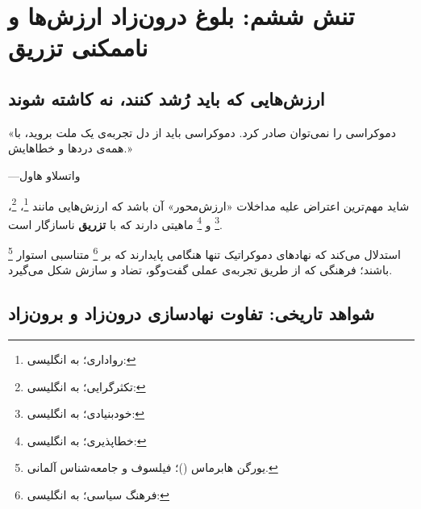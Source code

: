 \section{تنش ششم: بلوغ درون‌زاد ارزش‌ها و ناممکنی تزریق}
\label{sec:ch02-tension6}

\subsection{ارزش‌هایی که باید رُشد کنند، نه کاشته شوند}
\label{subsec:ch02-t6-growth}

\begin{tcolorbox}[quotebox, title={}]
	«دموکراسی را نمی‌توان صادر کرد. دموکراسی باید از دل تجربه‌ی
	یک ملت بروید، با همه‌ی دردها و خطاهایش.»
	
	\hfill ---واتسلاو هاول
\end{tcolorbox}

شاید مهم‌ترین اعتراض علیه مداخلات «ارزش‌محور» آن باشد که
ارزش‌هایی مانند
%
\footnote{رواداری؛ به انگلیسی: }،
%
\footnote{تکثرگرایی؛ به انگلیسی: }،
%
\footnote{خودبنیادی؛ به انگلیسی: }
و %
\footnote{خطاپذیری؛ به انگلیسی: }
ماهیتی دارند که با \textbf{تزریق} ناسازگار است.

%
\footnote{%
	یورگن هابرماس ()؛%
	فیلسوف و جامعه‌شناس آلمانی.%
}%
استدلال می‌کند که نهادهای دموکراتیک تنها هنگامی پایدارند که بر
%
\footnote{فرهنگ سیاسی؛ به انگلیسی: }%
متناسبی استوار باشند؛ فرهنگی که از طریق تجربه‌ی عملی گفت‌وگو،
تضاد و سازش شکل
می‌گیرد.

\subsection{شواهد تاریخی: تفاوت نهادسازی درون‌زاد و برون‌زاد}
\label{subsec:ch02-t6-evidence}

